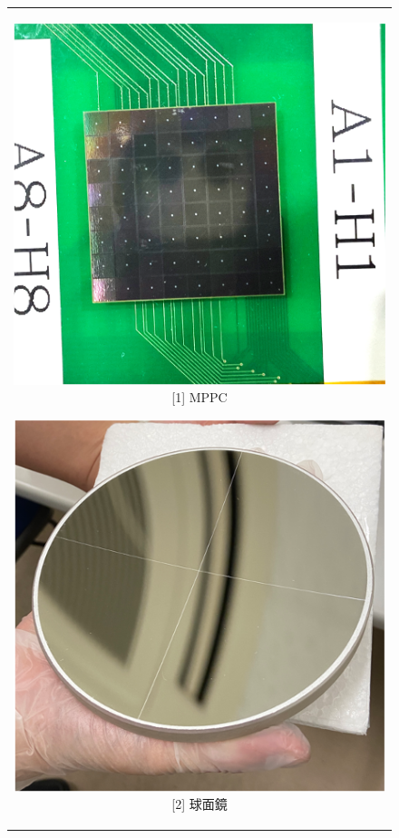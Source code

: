\documentclass[uplatex, titlepage, dvipdfmx, 12pt, a4paper]{jsreport}
\begin{document}
\begin{figure}[htbp]
  \begin{center}
    \begin{tabular}{c}

      \begin{minipage}{0.33\hsize}
        \begin{center}
          \includegraphics[clip, scale=0.6]{image/MPPC.png}
          \hspace{1.6cm} [1] MPPC
        \end{center}
      \end{minipage}

      \begin{minipage}{0.33\hsize}
        \begin{center}
          \includegraphics[clip, scale=0.6]{image/mirror.png}
          \hspace{1.6cm} [2] 球面鏡
        \end{center}
      \end{minipage}


\end{tabular}
\end{center}
\end{figure}
\end{document}
